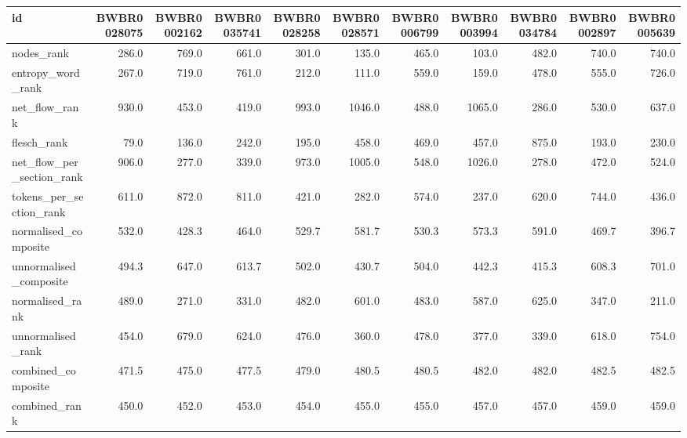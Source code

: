 \begin{tabular}{lrrrrrrrrrr}
\toprule
id & BWBR0028075 & BWBR0002162 & BWBR0035741 & BWBR0028258 & BWBR0028571 & BWBR0006799 & BWBR0003994 & BWBR0034784 & BWBR0002897 & BWBR0005639 \\
\midrule
nodes\_rank & 286.0 & 769.0 & 661.0 & 301.0 & 135.0 & 465.0 & 103.0 & 482.0 & 740.0 & 740.0 \\
\cline{1-11}
entropy\_word\_rank & 267.0 & 719.0 & 761.0 & 212.0 & 111.0 & 559.0 & 159.0 & 478.0 & 555.0 & 726.0 \\
\cline{1-11}
net\_flow\_rank & 930.0 & 453.0 & 419.0 & 993.0 & 1046.0 & 488.0 & 1065.0 & 286.0 & 530.0 & 637.0 \\
\cline{1-11}
flesch\_rank & 79.0 & 136.0 & 242.0 & 195.0 & 458.0 & 469.0 & 457.0 & 875.0 & 193.0 & 230.0 \\
\cline{1-11}
net\_flow\_per\_section\_rank & 906.0 & 277.0 & 339.0 & 973.0 & 1005.0 & 548.0 & 1026.0 & 278.0 & 472.0 & 524.0 \\
\cline{1-11}
tokens\_per\_section\_rank & 611.0 & 872.0 & 811.0 & 421.0 & 282.0 & 574.0 & 237.0 & 620.0 & 744.0 & 436.0 \\
\cline{1-11}
normalised\_composite & 532.0 & 428.3 & 464.0 & 529.7 & 581.7 & 530.3 & 573.3 & 591.0 & 469.7 & 396.7 \\
\cline{1-11}
unnormalised\_composite & 494.3 & 647.0 & 613.7 & 502.0 & 430.7 & 504.0 & 442.3 & 415.3 & 608.3 & 701.0 \\
\cline{1-11}
normalised\_rank & 489.0 & 271.0 & 331.0 & 482.0 & 601.0 & 483.0 & 587.0 & 625.0 & 347.0 & 211.0 \\
\cline{1-11}
unnormalised\_rank & 454.0 & 679.0 & 624.0 & 476.0 & 360.0 & 478.0 & 377.0 & 339.0 & 618.0 & 754.0 \\
\cline{1-11}
combined\_composite & 471.5 & 475.0 & 477.5 & 479.0 & 480.5 & 480.5 & 482.0 & 482.0 & 482.5 & 482.5 \\
\cline{1-11}
combined\_rank & 450.0 & 452.0 & 453.0 & 454.0 & 455.0 & 455.0 & 457.0 & 457.0 & 459.0 & 459.0 \\
\cline{1-11}
\bottomrule
\end{tabular}
